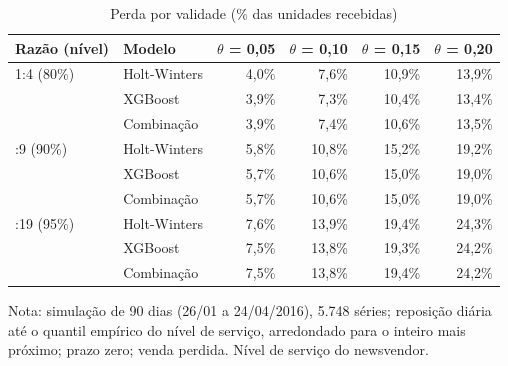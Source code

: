 \begin{table}[htbp]
\centering
\small
\caption{Perda por validade (\% das unidades recebidas)}
\label{tab:sim_perda}
\begin{tabular}{llrrrr}
\toprule
Razão (nível) & Modelo & $\theta$ = 0,05 & $\theta$ = 0,10 & $\theta$ = 0,15 & $\theta$ = 0,20 \\
\midrule
1:4 (80\%) & Holt-Winters & 4,0\% & 7,6\% & 10,9\% & 13,9\% \\
 & XGBoost & 3,9\% & 7,3\% & 10,4\% & 13,4\% \\
 & Combinação & 3,9\% & 7,4\% & 10,6\% & 13,5\% \\
\addlinespace
1:9 (90\%) & Holt-Winters & 5,8\% & 10,8\% & 15,2\% & 19,2\% \\
 & XGBoost & 5,7\% & 10,6\% & 15,0\% & 19,0\% \\
 & Combinação & 5,7\% & 10,6\% & 15,0\% & 19,0\% \\
\addlinespace
1:19 (95\%) & Holt-Winters & 7,6\% & 13,9\% & 19,4\% & 24,3\% \\
 & XGBoost & 7,5\% & 13,8\% & 19,3\% & 24,2\% \\
 & Combinação & 7,5\% & 13,8\% & 19,4\% & 24,2\% \\
\bottomrule
\end{tabular}
\par\smallskip
{\footnotesize Nota: simulação de 90 dias (26/01 a 24/04/2016), 5.748 séries; reposição diária até o quantil empírico do nível de serviço, arredondado para o inteiro mais próximo; prazo zero; venda perdida. Nível de serviço do newsvendor.}
\end{table}
